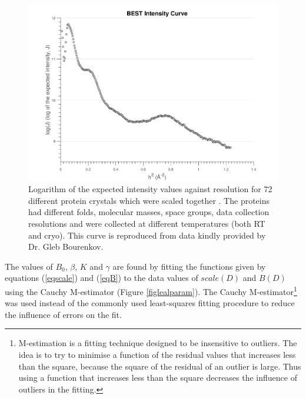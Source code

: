 \begin{figure}
    \centering
    \includegraphics[width=1.0\textwidth]{figures/dwd/bestcurve.pdf}
    \caption[\textit{BEST} intensity curve.]{Logarithm of the expected intensity values against resolution for 72 different protein crystals which were scaled together \cite{popov2003}. The proteins had different folds, molecular masses, space groups, data collection resolutions and were collected at different temperatures (both RT and cryo).
	This curve is reproduced from data kindly provided by Dr. Gleb Bourenkov.}
    \label{fig:BEST curve}
\end{figure}
The values of $B_0$, $\beta$, $K$ and $\gamma$ are found by fitting the functions given by equations (\ref{eqscale}) and (\ref{eqB}) to the data values of $scale(D)$ and $B(D)$ using the Cauchy M-estimator (Figure \ref{figlealparam}).
The Cauchy M-estimator\footnote{M-estimation is a fitting technique designed to be insensitive to outliers. The idea is to try to minimise a function of the residual values that increases less than the square, because the square of the residual of an outlier is large. Thus using a function that increases less than the square decreases the influence of outliers in the fitting.} was used instead of the commonly used least-squares fitting procedure to reduce the influence of errors on the fit.
